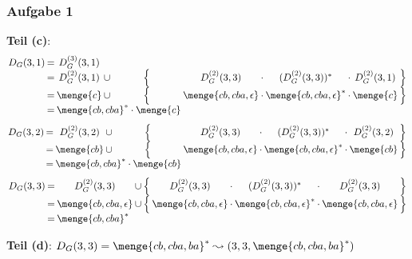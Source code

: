 \documentclass{beamer}
\begin{document}
\begin{frame} \frametitle{Aufgabe 1}
	\small
	\textbf{Teil (c)}:
	\begin{equation*}
	\setlength{\arraycolsep}{1pt}
		\begin{array}{rcccccccccc}
			D_G(3,1) &=& D_G^{(3)}(3,1) \\
			&=& D_G^{(2)}(3,1) &\cup& \Big\{ & D_G^{(2)}(3,3) &\cdot& (D_G^{(2)}(3,3))^\ast &\cdot& D_G^{(2)}(3,1) & \Big\}\\
			&=& \menge{c} &\cup& \Big\{ & \menge{cb,cba,\epsilon} &\cdot& \menge{cb,cba,\epsilon}^\ast &\cdot& \menge{c} & \Big\} \\
			&=& \multicolumn{3}{l}{\menge{cb,cba}^\ast \cdot \menge{c}}
		\end{array}
	\end{equation*}
	\pause
	\begin{equation*}
	\setlength{\arraycolsep}{1pt}
		\begin{array}{rcccccccccc}
		D_G(3,2)
		&=& D_G^{(2)}(3,2) &\cup& \Big\{ & D_G^{(2)}(3,3) &\cdot& (D_G^{(2)}(3,3))^\ast &\cdot& D_G^{(2)}(3,2) & \Big\}\\
		&=& \menge{cb} &\cup& \Big\{ & \menge{cb,cba,\epsilon} &\cdot& \menge{cb,cba,\epsilon}^\ast &\cdot& \menge{cb} & \Big\} \\
		&=& \multicolumn{3}{l}{\menge{cb,cba}^\ast \cdot \menge{cb}}
		\end{array}
	\end{equation*}
	\pause
	\begin{equation*}
	\setlength{\arraycolsep}{1pt}
		\begin{array}{rcccccccccc}
		D_G(3,3)
		&=& D_G^{(2)}(3,3) &\cup& \Big\{ & D_G^{(2)}(3,3) &\cdot& (D_G^{(2)}(3,3))^\ast &\cdot& D_G^{(2)}(3,3) & \Big\}\\
		&=& \menge{cb, cba, \epsilon} &\cup& \Big\{ & \menge{cb,cba,\epsilon} &\cdot& \menge{cb,cba,\epsilon}^\ast &\cdot& \menge{cb, cba, \epsilon} & \Big\} \\
		&=& \multicolumn{3}{l}{\menge{cb,cba}^\ast}
		\end{array}
	\end{equation*}
	
	\pause
	
	\textbf{Teil (d)}:  $D_G(3,3) = \menge{cb, cba, ba}^\ast \leadsto (3,3, \menge{cb, cba, ba}^\ast)$
\end{frame}
\end{document}
